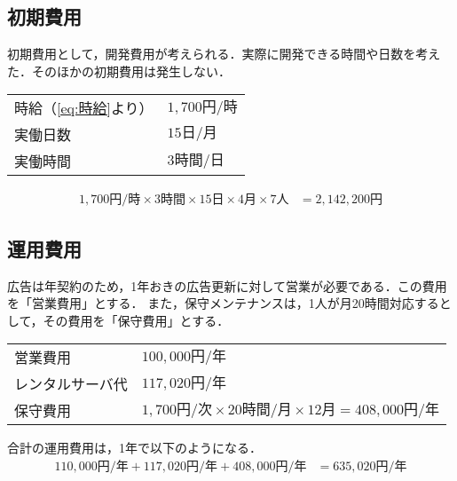 \subsection{初期費用}
初期費用として，開発費用が考えられる．実際に開発できる時間や日数を考えた．そのほかの初期費用は発生しない．
\begin{framed}
    \begin{tabular}{ll}
        時給（\eqref{eq:時給}より） & \(1,700\text{円/時}\) \\
        実働日数                & \(15\text{日/月}\)    \\
        実働時間                & \(3\text{時間/日}\)
    \end{tabular}
\end{framed}
\begin{equation}
    \begin{aligned}
        1,700{円/時}\times 3\text{時間}\times 15\text{日}\times 4\text{月}\times 7\text{人} & = 2,142,200\text{円}\label{eq:開発費用}
    \end{aligned}
\end{equation}
\subsection{運用費用}
広告は年契約のため，1年おきの広告更新に対して営業が必要である．この費用を「営業費用」とする．
また，保守メンテナンスは，1人が月20時間対応するとして，その費用を「保守費用」とする．
\begin{framed}
    \begin{tabular}{ll}
        営業費用     & \(100,000\text{円/年}\)                                                      \\
        レンタルサーバ代 & \(117,020\text{円/年}\)                                                      \\
        保守費用     & \(1,700\text{円/次}\times 20\text{時間/月}\times 12\text{月}=408,000\text{円/年}\) \\
    \end{tabular}
\end{framed}
合計の運用費用は，1年で以下のようになる．
\begin{equation}
    \begin{aligned}
        110,000\text{円/年}+117,020\text{円/年}+408,000\text{円/年} & =635,020\text{円/年}\label{eq:運用費用}
    \end{aligned}
\end{equation}
